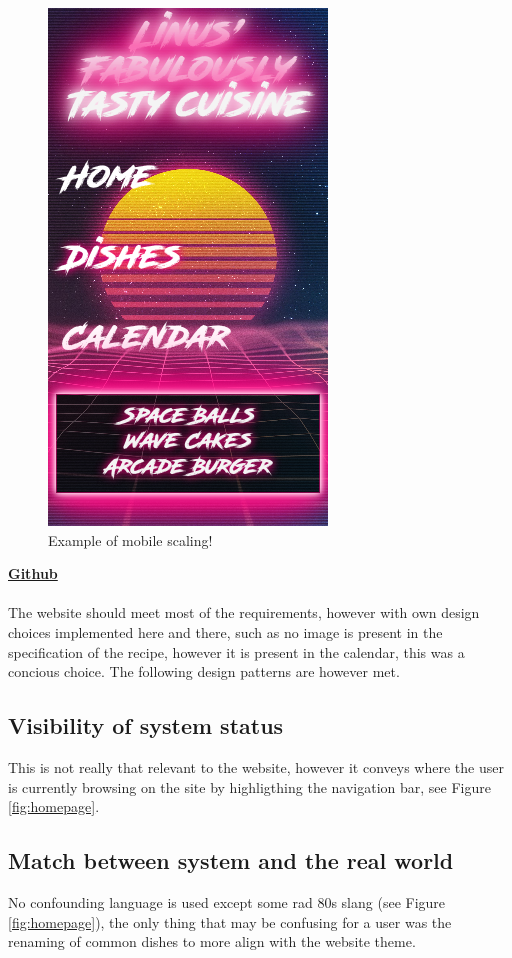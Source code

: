 \documentclass[a4paper]{scrartcl}
\begin{document}
\begin{figure}[H]
  \begin{center}
    \includegraphics[scale=0.35]{Scr6.png}
    \caption{Example of mobile scaling!}
    \label{fig:recipe}
  \end{center}
\end{figure}
\newpage
\newpage
\noindent
\textbf{\href{https://github.com/linus-dev/KTH-Projects/tree/master/ID1354/1}{Github}}\\\\
The website should meet most of the requirements, however with own design choices implemented here and
there, such as no image is present in the specification of the recipe, however it is present in the
calendar, this was a concious choice. The following design patterns are however met.
\subsection{Visibility of system status}
This is not really that relevant to the website, however it conveys where the user
is currently browsing on the site by highligthing the navigation bar, see Figure \ref{fig:homepage}.
\subsection{Match between system and the real world}
No confounding language is used except some rad 80s slang (see Figure \ref{fig:homepage}),
the only thing that may be confusing for a user was the renaming of common dishes
to more align with the website theme.
\end{document}
